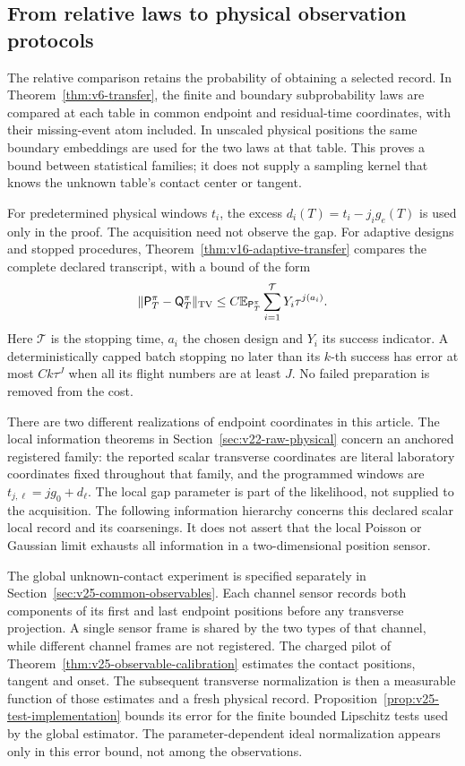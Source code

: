 \subsection{From relative laws to physical observation protocols}
\label{subsec:v25-protocol-scope}

The relative comparison retains the probability of obtaining a selected
record.  In Theorem~\ref{thm:v6-transfer}, the finite and boundary
subprobability laws are compared at each table in common endpoint and
residual-time coordinates, with their missing-event atom included.  In
unscaled physical positions the same boundary embeddings are used for the
two laws at that table.  This proves a bound between statistical families;
it does not supply a sampling kernel that knows the unknown table's
contact center or tangent.

For predetermined physical windows \(t_i\), the excess
\(d_i(T)=t_i-j_i g_e(T)\) is used only in the proof.  The acquisition need
not observe the gap.  For adaptive designs and stopped procedures,
Theorem~\ref{thm:v16-adaptive-transfer} compares the complete declared
transcript, with a bound of the form
\[
 \|\mathsf P_T^\pi-\mathsf Q_T^\pi\|_{\rm TV}
       \le C\mathbb E_{\mathsf P_T^\pi}
                    \sum_{i=1}^{\mathcal T}Y_i\tau^{j(a_i)}.
\]
Here \(\mathcal T\) is the stopping time, \(a_i\) the chosen design and
\(Y_i\) its success indicator.  A deterministically capped batch stopping
no later than its \(k\)-th success has error at most \(Ck\tau^J\) when
all its flight numbers are at least \(J\).  No failed preparation is
removed from the cost.

There are two different realizations of endpoint coordinates in this
article.  The local information theorems in
Section~\ref{sec:v22-raw-physical} concern an anchored registered family:
the reported scalar transverse coordinates are literal laboratory
coordinates fixed throughout that family, and the programmed windows are
\(t_{j,\ell}=jg_0+d_\ell\).  The local gap parameter is part of the
likelihood, not supplied to the acquisition.  The following information
hierarchy concerns this declared scalar local record and its coarsenings.
It does not assert that the local Poisson or Gaussian limit exhausts all
information in a two-dimensional position sensor.

The global unknown-contact experiment is specified separately in
Section~\ref{sec:v25-common-observables}.  Each channel sensor records both
components of its first and last endpoint positions before any transverse
projection.  A single sensor frame is shared by the two types of that
channel, while different channel frames are not registered.  The charged
pilot of Theorem~\ref{thm:v25-observable-calibration} estimates the contact
positions, tangent and onset.  The subsequent transverse normalization is
then a measurable function of those estimates and a fresh physical record.
Proposition~\ref{prop:v25-test-implementation} bounds its error for the
finite bounded Lipschitz tests used by the global estimator.  The
parameter-dependent ideal normalization appears only in this error bound,
not among the observations.

